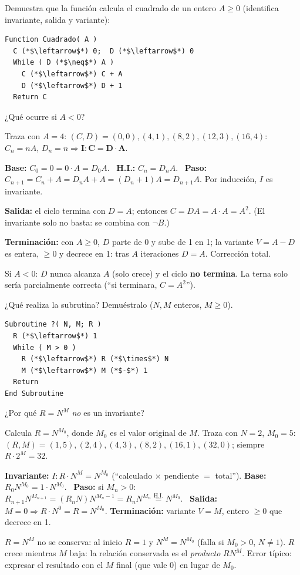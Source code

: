 \begin{prob}
Demuestra que la función calcula el cuadrado de un entero $A\ge0$ (identifica invariante, salida y variante):
\begin{lstlisting}
Function Cuadrado( A )
  C (*$\leftarrow$*) 0;  D (*$\leftarrow$*) 0
  While ( D (*$\neq$*) A )
    C (*$\leftarrow$*) C + A
    D (*$\leftarrow$*) D + 1
  Return C
\end{lstlisting}
¿Qué ocurre si $A<0$?
\end{prob}
\begin{sol}
Traza con $A=4$: $(C,D)=(0,0),(4,1),(8,2),(12,3),(16,4)$: $C_n=nA$, $D_n=n\Rightarrow\mathbf{I: C=D\cdot A}$.

\textbf{Base:} $C_0=0=0\cdot A=D_0A$. \ \textbf{H.I.:} $C_n=D_nA$. \ \textbf{Paso:} $C_{n+1}=C_n+A=D_nA+A=(D_n+1)A=D_{n+1}A$. Por inducción, $I$ es invariante.

\textbf{Salida:} el ciclo termina con $D=A$; entonces $C=DA=A\cdot A=A^2$. (El invariante solo no basta: se combina con $\neg B$.)

\textbf{Terminación:} con $A\ge0$, $D$ parte de 0 y sube de 1 en 1; la variante $V=A-D$ es entera, $\ge0$ y decrece en 1: tras $A$ iteraciones $D=A$. Corrección total.

Si $A<0$: $D$ nunca alcanza $A$ (solo crece) y el ciclo \textbf{no termina}. La terna solo sería parcialmente correcta (``si terminara, $C=A^2$'').
\end{sol}

\begin{prob}
¿Qué realiza la subrutina? Demuéstralo ($N,M$ enteros, $M\ge0$).
\begin{lstlisting}
Subroutine ?( N, M; R )
  R (*$\leftarrow$*) 1
  While ( M > 0 )
    R (*$\leftarrow$*) R (*$\times$*) N
    M (*$\leftarrow$*) M (*$-$*) 1
  Return
End Subroutine
\end{lstlisting}
¿Por qué $R=N^M$ \emph{no} es un invariante?
\end{prob}
\begin{sol}
Calcula $R=N^{M_0}$, donde $M_0$ es el valor original de $M$.
Traza con $N=2$, $M_0=5$: $(R,M)=(1,5),(2,4),(4,3),(8,2),(16,1),(32,0)$; siempre $R\cdot2^M=32$.

\textbf{Invariante:} $I: R\cdot N^{M}=N^{M_0}$ (``calculado $\times$ pendiente $=$ total'').
\textbf{Base:} $R_0N^{M_0}=1\cdot N^{M_0}$. \checkmark\
\textbf{Paso:} si $M_n>0$: $R_{n+1}N^{M_{n+1}}=(R_nN)N^{M_n-1}=R_nN^{M_n}\overset{\text{H.I.}}=N^{M_0}$. \checkmark\
\textbf{Salida:} $M=0\Rightarrow R\cdot N^0=R=N^{M_0}$.
\textbf{Terminación:} variante $V=M$, entero $\ge0$ que decrece en 1.

$R=N^M$ no se conserva: al inicio $R=1$ y $N^M=N^{M_0}$ (falla si $M_0>0$, $N\ne1$). $R$ crece mientras $M$ baja: la relación conservada es el \emph{producto} $RN^M$. Error típico: expresar el resultado con el $M$ final (que vale 0) en lugar de $M_0$.
\end{sol}

